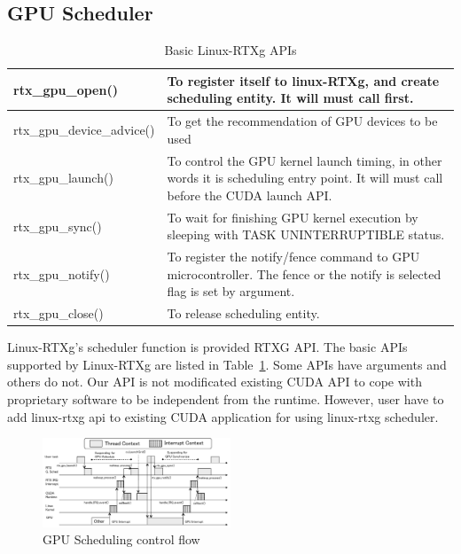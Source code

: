 \subsection{GPU Scheduler}
\begin{table}[t]
\begin{center}
\caption{Basic Linux-RTXg APIs}
\label{tab:rtx-api}
\begin{tabular}{|l|p{50em}|} \hline
rtx\_gpu\_open() & To register itself to linux-RTXg, and create scheduling entity. It will must call first. \\ \hline
rtx\_gpu\_device\_advice() & To get the recommendation of GPU devices to be used \\ \hline
rtx\_gpu\_launch() & To control the GPU kernel launch timing, in other words it is scheduling entry point. It will must call before the CUDA launch API. \\ \hline
rtx\_gpu\_sync() & To wait for finishing GPU kernel execution by sleeping with TASK UNINTERRUPTIBLE status.\\ \hline
rtx\_gpu\_notify() & To register the notify/fence command to GPU microcontroller. The fence or the notify is selected flag is set by argument.\\ \hline
rtx\_gpu\_close() & To release scheduling entity.\\ \hline
\end{tabular}
\end{center}
\end{table}

Linux-RTXg's scheduler function is provided RTXG API.
The basic APIs supported by Linux-RTXg are listed in Table~\ref{tab:rtx-api}.
Some APIs have arguments and others do not.
Our API is not modificated existing CUDA API to cope with　proprietary software to be independent from the runtime.
However, user have to add linux-rtxg api to existing CUDA application for using linux-rtxg scheduler.

\begin{figure}[t]
\begin{center}
\includegraphics[width=0.5\textwidth]{img/gsched_controlflow.pdf}
\caption{GPU Scheduling control flow}
\end{center}
\label{fig:controlflow}
\end{figure}

